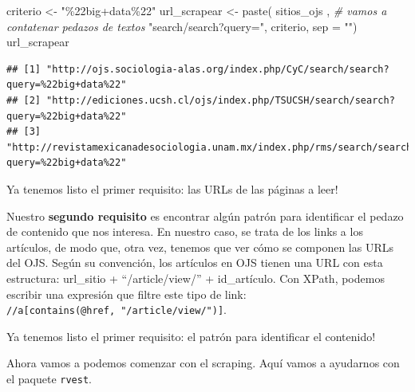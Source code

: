 \documentclass[
]{book}
\newenvironment{Shaded}{\begin{snugshade}}{\end{snugshade}}
\newcommand{\AttributeTok}[1]{\textcolor[rgb]{0.77,0.63,0.00}{#1}}
\newcommand{\CommentTok}[1]{\textcolor[rgb]{0.56,0.35,0.01}{\textit{#1}}}
\newcommand{\FunctionTok}[1]{\textcolor[rgb]{0.00,0.00,0.00}{#1}}
\newcommand{\NormalTok}[1]{#1}
\newcommand{\OtherTok}[1]{\textcolor[rgb]{0.56,0.35,0.01}{#1}}
\newcommand{\StringTok}[1]{\textcolor[rgb]{0.31,0.60,0.02}{#1}}
\begin{document}
\begin{Shaded}
\begin{Highlighting}[]
\NormalTok{criterio }\OtherTok{\textless{}{-}} \StringTok{"\%22big+data\%22"}
\NormalTok{url\_scrapear }\OtherTok{\textless{}{-}} \FunctionTok{paste}\NormalTok{( sitios\_ojs , }\CommentTok{\# vamos a contatenar pedazos de textos}
                       \StringTok{"search/search?query="}\NormalTok{,}
\NormalTok{                       criterio,}
                       \AttributeTok{sep =} \StringTok{""}\NormalTok{)}
\NormalTok{url\_scrapear}
\end{Highlighting}
\end{Shaded}

\begin{verbatim}
## [1] "http://ojs.sociologia-alas.org/index.php/CyC/search/search?query=%22big+data%22"            
## [2] "http://ediciones.ucsh.cl/ojs/index.php/TSUCSH/search/search?query=%22big+data%22"           
## [3] "http://revistamexicanadesociologia.unam.mx/index.php/rms/search/search?query=%22big+data%22"
\end{verbatim}

Ya tenemos listo el primer requisito: las URLs de las páginas a leer!

Nuestro \textbf{segundo requisito} es encontrar algún patrón para identificar el pedazo de contenido que nos interesa. En nuestro caso, se trata de los links a los artículos, de modo que, otra vez, tenemos que ver cómo se componen las URLs del OJS. Según su convención, los artículos en OJS tienen una URL con esta estructura: url\_sitio + ``/article/view/'' + id\_artículo. Con XPath, podemos escribir una expresión que filtre este tipo de link: \texttt{//a{[}contains(@href,\ "/article/view/"){]}}.

Ya tenemos listo el primer requisito: el patrón para identificar el contenido!

Ahora vamos a podemos comenzar con el scraping. Aquí vamos a ayudarnos con el paquete \texttt{rvest}.
\end{document}
